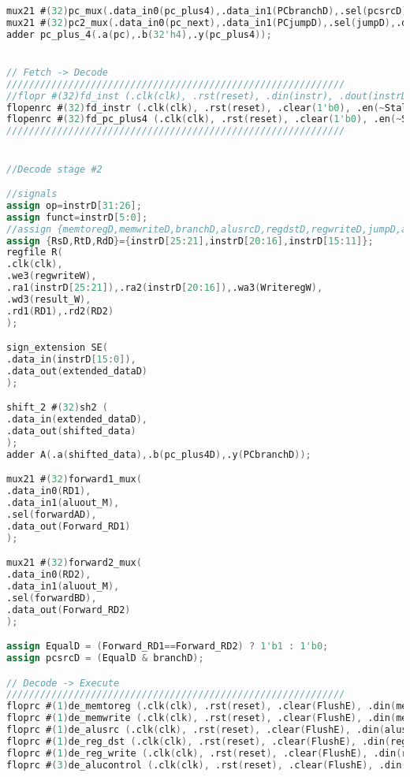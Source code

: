 \begin{lstlisting}[language=Verilog,frame=single]
mux21 #(32)pc_mux(.data_in0(pc_plus4),.data_in1(PCbranchD),.sel(pcsrcD),.data_out(pc_next));
mux21 #(32)pc2_mux(.data_in0(pc_next),.data_in1(PCjumpD),.sel(jumpD),.data_out(pc__next));
adder pc_plus_4(.a(pc),.b(32'h4),.y(pc_plus4));


// Fetch -> Decode
////////////////////////////////////////////////////////////
//flopr #(32)fd_inst (.clk(clk), .rst(reset), .din(instr), .dout(instrD));
flopenrc #(32)fd_instr (.clk(clk), .rst(reset), .clear(1'b0), .en(~StallD), .din(instr), .dout(instrD));
flopenrc #(32)fd_pc_plus4 (.clk(clk), .rst(reset), .clear(1'b0), .en(~StallD), .din(pc_plus4), .dout(pc_plus4D));
////////////////////////////////////////////////////////////


//Decode stage #2

//signals
assign op=instrD[31:26];
assign funct=instrD[5:0];
//assign {memtoregD,memwriteD,branchD,alusrcD,regdstD,regwriteD,jumpD,alucontrolD}={memtoreg,memwrite,branch,alusrc,regdst,regwrite,jump,alucontrol};
assign {RsD,RtD,RdD}={instrD[25:21],instrD[20:16],instrD[15:11]};
regfile R(
.clk(clk),
.we3(regwriteW),
.ra1(instrD[25:21]),.ra2(instrD[20:16]),.wa3(WriteregW),
.wd3(result_W),
.rd1(RD1),.rd2(RD2)
);

sign_extension SE(
.data_in(instrD[15:0]),
.data_out(extended_dataD)
);

shift_2 #(32)sh2 (
.data_in(extended_dataD),
.data_out(shifted_data)
);
adder A(.a(shifted_data),.b(pc_plus4D),.y(PCbranchD));

mux21 #(32)forward1_mux(
.data_in0(RD1),
.data_in1(aluout_M),
.sel(forwardAD),
.data_out(Forward_RD1)
);

mux21 #(32)forward2_mux(
.data_in0(RD2),
.data_in1(aluout_M),
.sel(forwardBD),
.data_out(Forward_RD2)
);

assign EqualD = (Forward_RD1==Forward_RD2) ? 1'b1 : 1'b0;
assign pcsrcD = (EqualD & branchD);

// Decode -> Execute
////////////////////////////////////////////////////////////
floprc #(1)de_memtoreg (.clk(clk), .rst(reset), .clear(FlushE), .din(memtoregD), .dout(memtoregE));
floprc #(1)de_memwrite (.clk(clk), .rst(reset), .clear(FlushE), .din(memwriteD), .dout(memwriteE));
floprc #(1)de_alusrc (.clk(clk), .rst(reset), .clear(FlushE), .din(alusrcD), .dout(alusrcE));
floprc #(1)de_reg_dst (.clk(clk), .rst(reset), .clear(FlushE), .din(regdstD), .dout(regdstE));
floprc #(1)de_reg_write (.clk(clk), .rst(reset), .clear(FlushE), .din(regwriteD), .dout(regwriteE));
floprc #(3)de_alucontrol (.clk(clk), .rst(reset), .clear(FlushE), .din(alucontrolD), .dout(alucontrolE));


\end{lstlisting}
